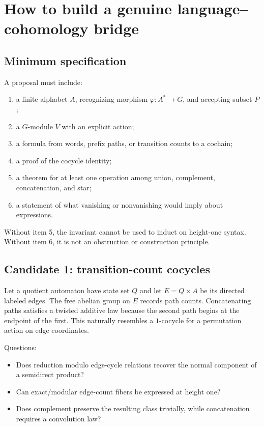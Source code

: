 \documentclass{amsart}
\begin{document}
\section{How to build a genuine language--cohomology bridge}

\subsection{Minimum specification}

A proposal must include:
\begin{enumerate}
  \item a finite alphabet $A$, recognizing morphism $\varphi:A^\ast\to G$, and accepting subset $P$;
  \item a $G$-module $V$ with an explicit action;
  \item a formula from words, prefix paths, or transition counts to a cochain;
  \item a proof of the cocycle identity;
  \item a theorem for at least one operation among union, complement, concatenation, and star;
  \item a statement of what vanishing or nonvanishing would imply about expressions.
\end{enumerate}

Without item 5, the invariant cannot be used to induct on height-one syntax.  Without item 6, it is not an obstruction or construction principle.

\subsection{Candidate 1: transition-count cocycles}

Let a quotient automaton have state set $Q$ and let $E=Q\times A$ be its directed labeled edges.  The free abelian group on $E$ records path counts.  Concatenating paths satisfies a twisted additive law because the second path begins at the endpoint of the first.  This naturally resembles a $1$-cocycle for a permutation action on edge coordinates.

Questions:
\begin{itemize}
  \item Does reduction modulo edge-cycle relations recover the normal component of a semidirect product?
  \item Can exact/modular edge-count fibers be expressed at height one?
  \item Does complement preserve the resulting class trivially, while concatenation requires a convolution law?
\end{itemize}
\end{document}
